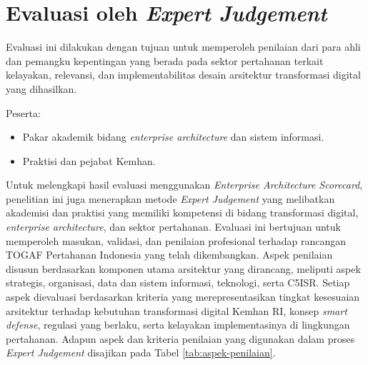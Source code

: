 \section{Evaluasi oleh \textit{Expert Judgement}}
Evaluasi ini dilakukan dengan tujuan untuk memperoleh penilaian dari para ahli dan pemangku kepentingan yang berada pada sektor pertahanan terkait kelayakan, relevansi, dan implementabilitas desain arsitektur transformasi digital yang dihasilkan.

Peserta:
\begin{itemize}
  \item Pakar akademik bidang \textit{enterprise architecture} dan sistem informasi.
  \item Praktisi dan pejabat Kemhan.
\end{itemize}

Untuk melengkapi hasil evaluasi menggunakan \textit{Enterprise Architecture Scorecard}\texttrademark{}, penelitian ini juga menerapkan metode \textit{Expert Judgement} yang melibatkan akademisi dan praktisi yang memiliki kompetensi di bidang transformasi digital, \textit{enterprise architecture}, dan sektor pertahanan.
Evaluasi ini bertujuan untuk memperoleh masukan, validasi, dan penilaian profesional terhadap rancangan TOGAF Pertahanan Indonesia yang telah dikembangkan.
Aspek penilaian disusun berdasarkan komponen utama arsitektur yang dirancang, meliputi aspek strategis, organisasi, data dan sistem informasi, teknologi, serta C5ISR.
Setiap aspek dievaluasi berdasarkan kriteria yang merepresentasikan tingkat kesesuaian arsitektur terhadap kebutuhan transformasi digital Kemhan RI, konsep \textit{smart defense}, regulasi yang berlaku, serta kelayakan implementasinya di lingkungan pertahanan.
Adapun aspek dan kriteria penilaian yang digunakan dalam proses \textit{Expert Judgement} disajikan pada Tabel \ref{tab:aspek-penilaian}.

